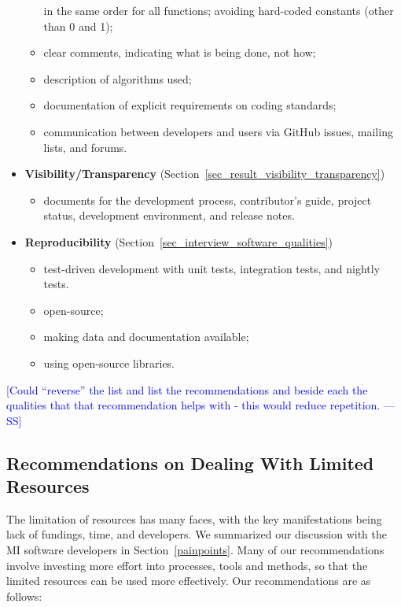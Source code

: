 \documentclass[final, 3p, times, authoryear]{elsarticle}
\newcommand{\authornote}[3]{\textcolor{#1}{[#3 ---#2]}}
\newcommand{\authornote}[3]{}
\newcommand{\wss}[1]{\authornote{blue}{SS}{#1}} %
\begin{document}
\begin{itemize}
\begin{itemize}
    in the same order for all functions; avoiding hard-coded constants (other
    than 0 and 1);
    \item clear comments, indicating what is being done, not how;
    \item description of algorithms used;
    \item documentation of explicit requirements on coding standards;
    \item communication between developers and users via GitHub issues, mailing
    lists, and forums.
\end{itemize}
\item \textbf{Visibility/Transparency} (Section~\ref{sec_result_visibility_transparency})
\begin{itemize}
    \item documents for the development process, contributor's guide, project
    status, development environment, and release notes.
\end{itemize}
\item \textbf{Reproducibility} (Section~\ref{sec_interview_software_qualities})
\begin{itemize}
    \item test-driven development with unit tests, integration tests, and nightly tests.
    \item open-source;
    \item making data and documentation available;
    \item using open-source libraries.
\end{itemize}
\end{itemize}

\wss{Could ``reverse'' the list and list the recommendations and beside each the qualities 
that that recommendation helps with - this would reduce repetition.}

\subsection{Recommendations on Dealing With Limited Resources}
\label{sec_recommendations_limited_resources}

The limitation of resources has many faces, with the key manifestations being
lack of fundings, time, and developers. We summarized our discussion with the MI
software developers in Section~\ref{painpoints}.  Many of our recommendations
involve investing more effort into processes, tools and methods, so that the
limited resources can be used more effectively.  Our recommendations are as
follows:
\end{document}
